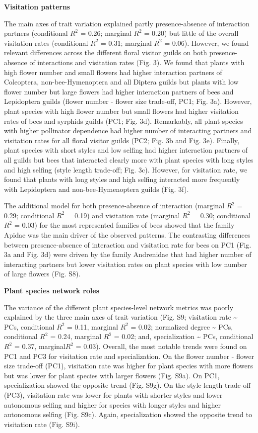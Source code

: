 \documentclass[
  12pt,
  a4paper,
]{article}
\begin{document}
\textbf{Visitation patterns}

The main axes of trait variation explained partly presence-absence of interaction partners (conditional \(R^{2}\) = 0.26; marginal \(R^{2}\) = 0.20) but little of the overall visitation rates (conditional \(R^{2}\) = 0.31; marginal \(R^{2}\) = 0.06). However, we found relevant differences across the different floral visitor guilds on both presence-absence of interactions and visitation rates (Fig. 3). We found that plants with high flower number and small flowers had higher interaction partners of Coleoptera, non-bee-Hymenoptera and all Diptera guilds but plants with low flower number but large flowers had higher interaction partners of bees and Lepidoptera guilds (flower number - flower size trade-off, PC1; Fig. 3a). However, plant species with high flower number but small flowers had higher visitation rates of bees and syrphids guilds (PC1; Fig. 3d). Remarkably, all plant species with higher pollinator dependence had higher number of interacting partners and visitation rates for all floral visitor guilds (PC2; Fig. 3b and Fig. 3e). Finally, plant species with short styles and low selfing had higher interaction partners of all guilds but bees that interacted clearly more with plant species with long styles and high selfing (style length trade-off; Fig. 3c). However, for visitation rate, we found that plants with long styles and high selfing interacted more frequently with Lepidoptera and non-bee-Hymenoptera guilds (Fig. 3f).

The additional model for both presence-absence of interaction (marginal \(R^{2}\) = 0.29; conditional \(R^{2}\) = 0.19) and visitation rate (marginal \(R^{2}\) = 0.30; conditional \(R^{2}\) = 0.03) for the most represented families of bees showed that the family Apidae was the main driver of the observed patterns. The contrasting differences between presence-absence of interaction and visitation rate for bees on PC1 (Fig. 3a and Fig. 3d) were driven by the family Andrenidae that had higher number of interacting partners but lower visitation rates on plant species with low number of large flowers (Fig. S8).

\textbf{Plant species network roles}

The variance of the different plant species-level network metrics was poorly explained by the three main axes of trait variation (Fig. S9; visitation rate \textasciitilde{} PCs, conditional \(R^{2}\) = 0.11, marginal \(R^{2}\) = 0.02; normalized degree \textasciitilde{} PCs, conditional \(R^{2}\) = 0.24, marginal \(R^{2}\) = 0.02; and, specialization \textasciitilde{} PCs, conditional \(R^{2}\) = 0.37, marginal\(R^{2}\) = 0.03). Overall, the most notable trends were found on PC1 and PC3 for visitation rate and specialization. On the flower number - flower size trade-off (PC1), visitation rate was higher for plant species with more flowers but was lower for plant species with larger flowers (Fig. S9a). On PC1, specialization showed the opposite trend (Fig. S9g). On the style length trade-off (PC3), visitation rate was lower for plants with shorter styles and lower autonomous selfing and higher for species with longer styles and higher autonomous selfing (Fig. S9c). Again, specialization showed the opposite trend to visitation rate (Fig. S9i).
\end{document}
